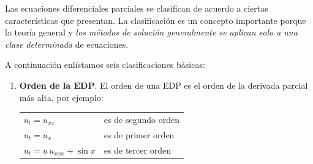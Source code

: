 Las ecuaciones diferenciales parciales se clasifican de acuerdo a ciertas características que presentan. La clasificación es un concepto importante porque la teoría general y \emph{los métodos de solución generalmente se aplican solo a una clase determinada} de ecuaciones.
\par
A continuación enlistamos seis clasificaciones básicas:
\begin{enumerate}
\item \textbf{Orden de la EDP}. El orden de una EDP es el orden de la derivada parcial más alta, por ejemplo:
\begin{table}[H]
\centering
\large
\begin{tabular}{l l}
\Large{$u_{t} = u_{xx}$} & es de segundo orden \\
\Large{$u_{t} = u_{x}$} & es de primer orden \\
\Large{$u_{t} = u \, u_{xxx} + \sin x$} & es de tercer orden
\end{tabular}
\end{table}


\end{enumerate}
